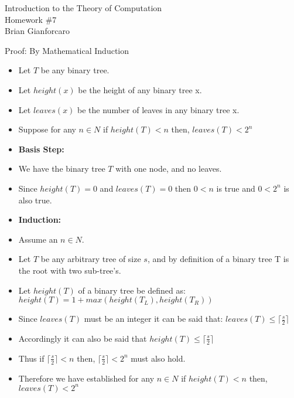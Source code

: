 \documentclass[11pt]{article}
\newcommand{\question}[2] {\vspace{.25in} \fbox{#1} #2 \vspace{.10in}}
\begin{document}
\medskip                        %

\begin{center}                  %
  {\Large Introduction to the Theory of Computation \\ Homework \#7} \\
  Brian Gianforcaro \\
  \date \\
\end{center}


\question{1}{Proof: By Mathematical Induction}
 \begin{center}
  \begin{itemize}
   \item Let $T$ be any binary tree.
   \item Let $height(x)$ be the height of any binary tree x.
   \item Let $leaves(x)$ be the number of leaves in any binary tree x.

   \item Suppose for any $n \in N$ if $height(T) < n$ then, $leaves(T) < 2^n$

   \item \textbf{Basis Step:}

   \item We have the binary tree $T$ with one node, and no leaves.
   
   \item Since $height(T) = 0$ and $leaves(T) = 0$ then $0 < n$ is true and $ 0 < 2^n$ is also true. 

   \item \textbf{Induction:}

   \item Assume an $n \in N$.

   \item Let $T$ be any arbitrary tree of size $s$, and by definition of a binary tree T is the root with two sub-tree's.

   \item Let $height(T)$ of a binary tree be defined as: $height(T) = 1 + max( height(T_L), height(T_R) ) $

   \item Since $leaves(T)$ must be an integer it can be said that: $leaves(T) \leq \lceil \frac{s}{2} \rceil $

   \item Accordingly it can also be said that $height(T) \leq \lceil \frac{s}{2} \rceil$

   \item Thus if  $\lceil \frac{s}{2} \rceil < n$ then, $ \lceil \frac{s}{2} \rceil < 2^n$ must also hold.
   
   \item Therefore we have established for any $n \in N$ if $height(T) < n$ then, $leaves(T) < 2^n$
  \end{itemize}
 \end{center}
\end{document}
